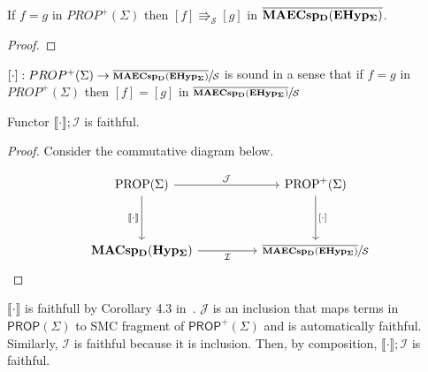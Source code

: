 \begin{theorem}
    If $f = g$ in $PROP^{+}(\Sigma)$ then $[f] \Rrightarrow_{\mathcal{S}} [g]$ in ${\mathbf{\overline{MAECsp_{D}(EHyp_{\Sigma})}}}$.
    \begin{proof}
    \end{proof}
\end{theorem}

\begin{corollary}
    $[\cdot] : PROP^{+}(\Sigma) \to \sfrac{{\mathbf{\overline{MAECsp_{D}(EHyp_{\Sigma})}}}}{\mathcal{S}}$ is sound in a sense that
    if $f = g$ in $PROP^{+}(\Sigma)$ then $[f] = [g]$ in $\sfrac{{\mathbf{\overline{MAECsp_{D}(EHyp_{\Sigma})}}}}{\mathcal{S}}$
\end{corollary}


\begin{proposition}
    Functor $\llbracket \cdot \rrbracket; \mathcal{I}$ is faithful.
    \begin{proof}
        Consider the commutative diagram below.

        \[
        \begin{tikzcd}
            {\text{PROP}(\Sigma)} && {\text{PROP}^{+}(\Sigma)} \\
            \\
            \MdaCospans && {\sfrac{\WellTypedMdaEcospans}{\mathcal{S}}}
            \arrow["{\mathcal{J}}", from=1-1, to=1-3]
            \arrow["{\llbracket \cdot \rrbracket}"', from=1-1, to=3-1]
            \arrow["{[\cdot]}", from=1-3, to=3-3]
            \arrow["{\mathcal{I}}"', from=3-1, to=3-3]
        \end{tikzcd}
        \]
    \end{proof}

    $\llbracket \cdot \rrbracket$ is faithfull by Corollary 4.3 in~\cite{Frobenius}.
    $\mathcal{J}$ is an inclusion that maps terms in $\textsf{PROP}(\Sigma)$ to SMC fragment of $\textsf{PROP}^{+}(\Sigma)$ and is automatically faithful. 
    Similarly, $\mathcal{I}$ is faithful because it is inclusion.
    Then, by composition, $\llbracket \cdot \rrbracket; \mathcal{I}$ is faithful. 
\end{proposition}

